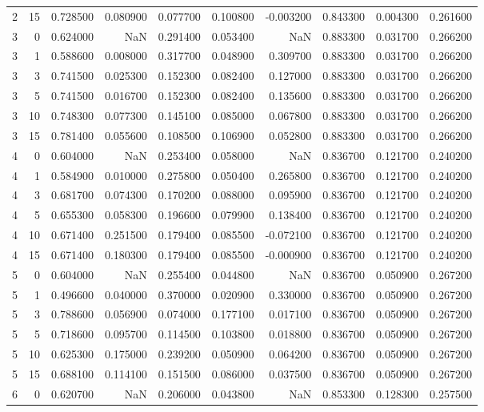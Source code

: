 \begin{table}
\begin{tabular}{rrrrrrrrrr}
2 & 15 & 0.728500 & 0.080900 & 0.077700 & 0.100800 & -0.003200 & 0.843300 & 0.004300 & 0.261600 \\
3 & 0 & 0.624000 & NaN & 0.291400 & 0.053400 & NaN & 0.883300 & 0.031700 & 0.266200 \\
3 & 1 & 0.588600 & 0.008000 & 0.317700 & 0.048900 & 0.309700 & 0.883300 & 0.031700 & 0.266200 \\
3 & 3 & 0.741500 & 0.025300 & 0.152300 & 0.082400 & 0.127000 & 0.883300 & 0.031700 & 0.266200 \\
3 & 5 & 0.741500 & 0.016700 & 0.152300 & 0.082400 & 0.135600 & 0.883300 & 0.031700 & 0.266200 \\
3 & 10 & 0.748300 & 0.077300 & 0.145100 & 0.085000 & 0.067800 & 0.883300 & 0.031700 & 0.266200 \\
3 & 15 & 0.781400 & 0.055600 & 0.108500 & 0.106900 & 0.052800 & 0.883300 & 0.031700 & 0.266200 \\
4 & 0 & 0.604000 & NaN & 0.253400 & 0.058000 & NaN & 0.836700 & 0.121700 & 0.240200 \\
4 & 1 & 0.584900 & 0.010000 & 0.275800 & 0.050400 & 0.265800 & 0.836700 & 0.121700 & 0.240200 \\
4 & 3 & 0.681700 & 0.074300 & 0.170200 & 0.088000 & 0.095900 & 0.836700 & 0.121700 & 0.240200 \\
4 & 5 & 0.655300 & 0.058300 & 0.196600 & 0.079900 & 0.138400 & 0.836700 & 0.121700 & 0.240200 \\
4 & 10 & 0.671400 & 0.251500 & 0.179400 & 0.085500 & -0.072100 & 0.836700 & 0.121700 & 0.240200 \\
4 & 15 & 0.671400 & 0.180300 & 0.179400 & 0.085500 & -0.000900 & 0.836700 & 0.121700 & 0.240200 \\
5 & 0 & 0.604000 & NaN & 0.255400 & 0.044800 & NaN & 0.836700 & 0.050900 & 0.267200 \\
5 & 1 & 0.496600 & 0.040000 & 0.370000 & 0.020900 & 0.330000 & 0.836700 & 0.050900 & 0.267200 \\
5 & 3 & 0.788600 & 0.056900 & 0.074000 & 0.177100 & 0.017100 & 0.836700 & 0.050900 & 0.267200 \\
5 & 5 & 0.718600 & 0.095700 & 0.114500 & 0.103800 & 0.018800 & 0.836700 & 0.050900 & 0.267200 \\
5 & 10 & 0.625300 & 0.175000 & 0.239200 & 0.050900 & 0.064200 & 0.836700 & 0.050900 & 0.267200 \\
5 & 15 & 0.688100 & 0.114100 & 0.151500 & 0.086000 & 0.037500 & 0.836700 & 0.050900 & 0.267200 \\
6 & 0 & 0.620700 & NaN & 0.206000 & 0.043800 & NaN & 0.853300 & 0.128300 & 0.257500 \\

\end{tabular}
\end{table}
